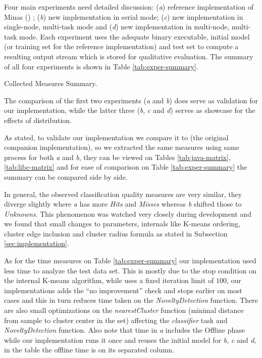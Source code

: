 Four main experiments need detailed discussion:
(\emph{a}) reference implementation of Minas () \cite{Faria2015minas};
(\emph{b}) new implementation in serial mode;
(\emph{c}) new implementation in single-node, multi-task mode and
(\emph{d}) new implementation in multi-node, multi-task mode.
Each experiment uses the adequate binary executable, initial model
(or training set for the reference implementation) and test set
to compute a resulting output stream which is stored for qualitative evaluation.
The summary of all four experiments is shown in Table \ref{tab:exper-summary}.

\begin{table}[hbt]
\begin{center}
  \caption{Collected Measures Summary.}
  \label{tab:exper-summary}
  
\end{center}
\end{table}

The comparison of the first two experiments (\emph{a} and \emph{b}) does serve as
validation for our implementation, while the latter three (\emph{b}, \emph{c}
and \emph{d}) serves as showcase for the effects of distribution.

As stated, to validate our implementation we compare it to 
(the original \minas companion implementation), so we extracted the same measures
using same process for both \emph{a} and \emph{b}, they can be viewed on
Tables \ref{tab:java-matrix}, \ref{tab:libc-matrix} and for ease of comparison
on Table \ref{tab:exper-summary} the summary can be compared side by side.

In general, the observed classification quality measures are very similar,
they diverge slightly where \emph{a} has more \emph{Hits} and \emph{Misses}
whereas \emph{b} shifted those to \emph{Unknowns}.
This phenomenon was watched very closely during development and we found that
small changes to \minas parameters, \minas internals like K-means ordering,
cluster edge inclusion and cluster radius formula as stated in
Subsection \ref{sec:implementation}.

As for the time measures on Table \ref{tab:exper-summary}
our implementation used less time to analyze the test data set.
This is mostly due to 
the stop condition
on the internal K-means algorithm, while  uses a fixed iteration
limit of $100$, our implementations adds the ``no improvement'' check
and stops earlier on most cases and this in turn reduces time taken
on the \emph{NoveltyDetection} function.
There are also small optimizations on the \emph{nearestCluster} function
(minimal distance from sample to cluster center in the set)
affecting the \emph{classifier} task and \emph{NoveltyDetection} function.
Also note that  time in \emph{a} includes the Offline phase while our
implementation runs it once and reuses the initial model for \emph{b}, \emph{c}
and \emph{d}, in the table the offline time is on its separated column.

